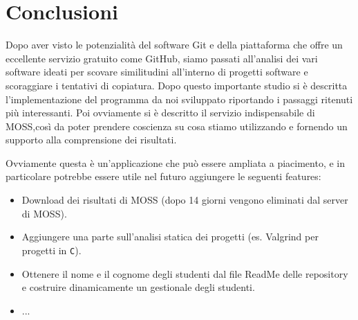 \chapter{Conclusioni}
	Dopo aver visto le potenzialità del software Git e della piattaforma che offre un eccellente servizio gratuito come GitHub, siamo passati all'analisi dei vari software ideati per scovare similitudini all'interno di progetti software e scoraggiare i tentativi di copiatura.
	Dopo questo importante studio si è descritta l'implementazione del programma da noi sviluppato riportando i passaggi ritenuti più interessanti. Poi ovviamente si è descritto il servizio indispensabile di MOSS,così da poter prendere coscienza su cosa stiamo utilizzando e fornendo un supporto alla comprensione dei risultati.
	
	Ovviamente questa è un'applicazione che può essere ampliata a piacimento, e in particolare potrebbe essere utile nel futuro aggiungere le seguenti features:
	\begin{itemize}
		\item Download dei risultati di MOSS (dopo 14 giorni vengono eliminati dal server di MOSS).
		\item Aggiungere una parte sull'analisi statica dei progetti (es. Valgrind per progetti in \verb|C|).
		\item Ottenere il nome e il cognome degli studenti dal file ReadMe delle repository e costruire dinamicamente un gestionale degli studenti.
		\item ...
	\end{itemize}